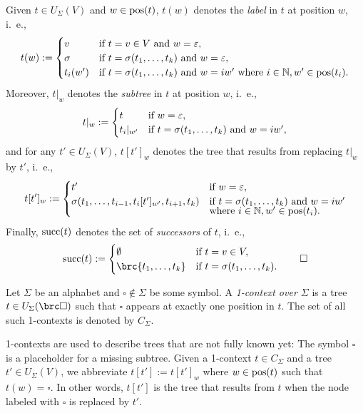 \begin{definition}
 Given $t\in U_\Sigma(V)$ and $w\in\operatorname{pos}(t)$, $t(w)$ denotes the \emph{label} in $t$ at position $w$, i.~e.,
 \[
  t(w) := \begin{cases}
   v & \text{if } t = v\in V \text{ and } w=\varepsilon, \\
   \sigma & \text{if } t = \sigma(t_1,\ldots,t_k) \text{ and } w = \varepsilon, \\
   t_i(w') & \text{if } t = \sigma(t_1,\ldots,t_k) \text{ and } w = iw' \text{ where } i\in\mathbb N, w'\in\operatorname{pos}(t_i).
  \end{cases}
 \]
 Moreover, $t|_w$ denotes the \emph{subtree} in $t$ at position $w$, i.~e.,
 \[
  t|_w := \begin{cases}
   t & \text{if } w = \varepsilon, \\
   t_i|_{w'} & \text{if } t = \sigma(t_1,\ldots,t_k) \text{ and } w = iw',
  \end{cases}
 \]
 and for any $t'\in U_\Sigma(V)$, $t[t']_w$ denotes the tree that results from replacing $t|_w$ by $t'$, i.~e.,
 \[
  t[t']_w := \begin{cases}
   t' & \text{if } w = \varepsilon, \\
   \sigma(t_1,\ldots,t_{i-1},t_i[t']_{w'},t_{i+1},t_k) & \text{if } t = \sigma(t_1,\ldots,t_k) \text{ and } w = iw' \\[-0.5em] & \text{where } i\in\mathbb N, w'\in\operatorname{pos}(t_i).
  \end{cases}
 \]
 Finally, $\operatorname{succ}(t)$ denotes the set of \emph{successors} of $t$, i.~e.,
 \[
  \osucc(t) := \begin{cases}
   \emptyset & \text{if } t = v\in V, \\
   \brc{t_1,\ldots,t_k} & \text{if } t = \sigma(t_1,\ldots,t_k).
  \end{cases}
  \qedhere
 \]
\end{definition}

\begin{definition}
 Let $\Sigma$ be an alphabet and $\square\notin\Sigma$ be some symbol. A
 \emph{1-context over $\Sigma$} is a tree $t\in U_\Sigma(\brc\square)$ such
 that $\square$ appears at exactly one position in $t$. The set of all such
 1-contexts is denoted by $C_\Sigma$.
\end{definition}

1-contexts are used to describe trees that are not fully known yet: The
symbol $\square$ is a placeholder for a missing subtree. Given a 1-context
$t\in C_\Sigma$ and a tree $t'\in U_\Sigma(V)$, we abbreviate $t[t'] :=
t[t']_w$ where $w\in\operatorname{pos}(t)$ such that $t(w) = \square$. In other words, $t[t']$ is the tree that
results from $t$ when the node labeled with $\square$ is replaced by $t'$.

